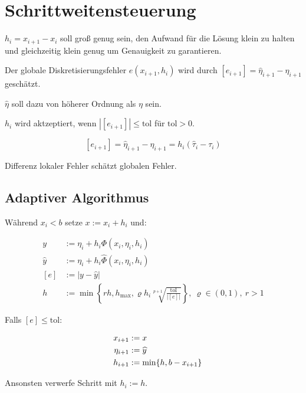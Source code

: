 \section*{Schrittweitensteuerung}

$h_i = x_{i+1} - x_i$ soll groß genug sein, den Aufwand für die Lösung klein zu halten und gleichzeitig klein genug um Genauigkeit zu garantieren.

\spacing

Der globale Diskretisierungsfehler $e(x_{i+1},h_i)$ wird durch $[e_{i+1}] = \widehat{\eta}_{i+1} - \eta_{i+1}$ geschätzt.

$\widehat{\eta}$ soll dazu von höherer Ordnung als $\eta$ sein.

$h_i$ wird aktzeptiert, wenn $|[e_{i+1}]| \leq \text{tol}$ für $\text{tol} > 0$.

\vspace{-2mm}
\[ [e_{i+1}] = \widehat{\eta}_{i+1} - \eta_{i+1} = h_i(\widehat{\tau}_i - \tau_i) \]

Differenz lokaler Fehler schätzt globalen Fehler.

\subsection*{Adaptiver Algorithmus}

Während $x_i < b$ setze $x := x_i + h_i$ und:

\vspace{-4mm}
\begin{align*}
y &:= \eta_i + h_i \Phi(x_i,\eta_i,h_i) \\
\widehat{y} &:= \eta_i + h_i \widehat{\Phi}(x_i,\eta_i,h_i) \\
[e] &:= |y-\widehat{y}| \\
h &:= \min\left\{rh, h_\text{max}, \varrho h_i \sqrt[p+1]{\frac{\text{tol}}{|[e]|}}\right\}, \ \varrho \in (0,1), \ r > 1
\end{align*}

Falls $[e] \leq \text{tol}$:

\vspace*{-10.7mm}
\begin{align*}
\hspace*{4mm}
x_{i+1} &:= x \\
\eta_{i+1} &:= \widehat{y} \\
h_{i+1} &:= \min\{h, b-x_{i+1}\}
\end{align*}

Ansonsten verwerfe Schritt mit $h_i := h$.

